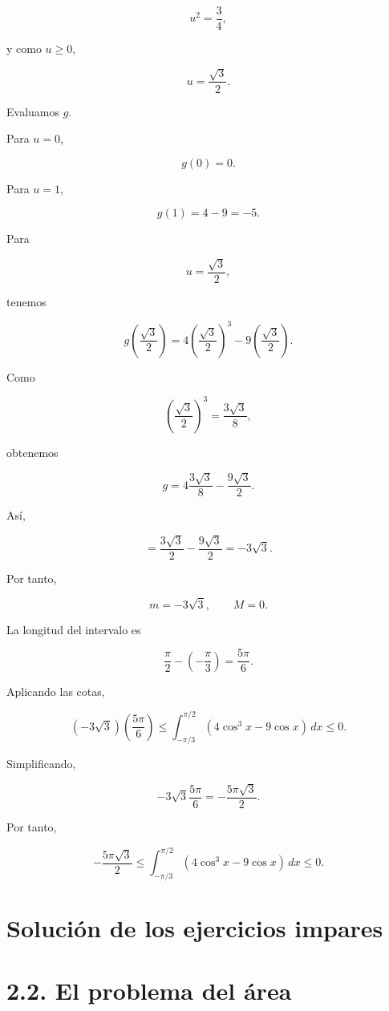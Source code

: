 \documentclass[12pt]{article}
\begin{document}
\[
u^2=\frac34,
\]

y como \(u\geq0\),

\[
u=\frac{\sqrt3}{2}.
\]

Evaluamos \(g\).

Para \(u=0\),

\[
g(0)=0.
\]

Para \(u=1\),

\[
g(1)=4-9=-5.
\]

Para

\[
u=\frac{\sqrt3}{2},
\]

tenemos

\[
g\left(\frac{\sqrt3}{2}\right)
=
4\left(\frac{\sqrt3}{2}\right)^3
-
9\left(\frac{\sqrt3}{2}\right).
\]

Como

\[
\left(\frac{\sqrt3}{2}\right)^3
=
\frac{3\sqrt3}{8},
\]

obtenemos

\[
g
=
4\frac{3\sqrt3}{8}
-
\frac{9\sqrt3}{2}.
\]

Así,

\[
=
\frac{3\sqrt3}{2}
-
\frac{9\sqrt3}{2}
=
-3\sqrt3.
\]

Por tanto,

\[
m=-3\sqrt3,
\qquad
M=0.
\]

La longitud del intervalo es

\[
\frac{\pi}{2}
-
\left(-\frac{\pi}{3}\right)
=
\frac{5\pi}{6}.
\]

Aplicando las cotas,

\[
(-3\sqrt3)
\left(
\frac{5\pi}{6}
\right)
\leq
\int_{-\pi/3}^{\pi/2}
(4\cos^3x-9\cos x)\,dx
\leq
0.
\]

Simplificando,

\[
-3\sqrt3\frac{5\pi}{6}
=
-\frac{5\pi\sqrt3}{2}.
\]

Por tanto,

\[
\boxed{
-\frac{5\pi\sqrt3}{2}
\leq
\int_{-\pi/3}^{\pi/2}
(4\cos^3x-9\cos x)\,dx
\leq
0
}.
\]


\section*{Solución de los ejercicios impares}

\section*{2.2. El problema del área}
\end{document}
